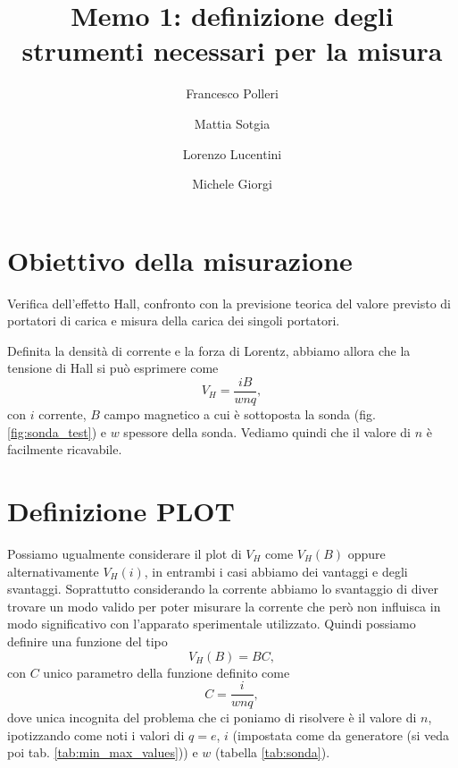 \documentclass[fleqn,varvw,11pt,tightenlines]{memo}
\begin{document}
\title{Memo 1: definizione degli strumenti necessari per la misura}

\author{Francesco Polleri}
\author{Mattia Sotgia}


\author{Lorenzo Lucentini}
\author{Michele Giorgi}

\revised{\today}

\begin{abstract}

\end{abstract}
\maketitle

\section{Obiettivo della misurazione}

Verifica dell'effetto Hall, confronto con la previsione teorica del valore previsto di portatori di carica e misura della carica dei singoli portatori.

Definita la densità di corrente e la forza di Lorentz, abbiamo allora che la tensione di Hall si può esprimere come \begin{equation}
    V_H = \frac{iB}{wnq},\label{eq:V_H_full}
\end{equation} con $i$ corrente, $B$ campo magnetico a cui è sottoposta la sonda (fig. \ref{fig:sonda_test}) e $w$ spessore della sonda. Vediamo quindi che il valore di $n$ è facilmente ricavabile. 



\section{Definizione PLOT}

Possiamo ugualmente considerare il plot di $V_H$ come $V_H(B)$ oppure alternativamente $V_H(i)$, in entrambi i casi abbiamo dei vantaggi e degli svantaggi. Soprattutto considerando la corrente abbiamo lo svantaggio di diver trovare un modo valido per poter misurare la corrente che però non influisca in modo significativo con l'apparato sperimentale utilizzato. 
Quindi possiamo definire una funzione del tipo \begin{equation}
    V_H(B) = BC,
\end{equation} con $C$ unico parametro della funzione definito come \begin{equation}
    C=\frac{i}{wnq},
\end{equation} dove unica incognita del problema che ci poniamo di risolvere è il valore di $n$, ipotizzando come noti i valori di $q=e$, $i$ (impostata come da generatore (si veda poi tab. \ref{tab:min_max_values})) e $w$ (tabella \ref{tab:sonda}).
\end{document}
